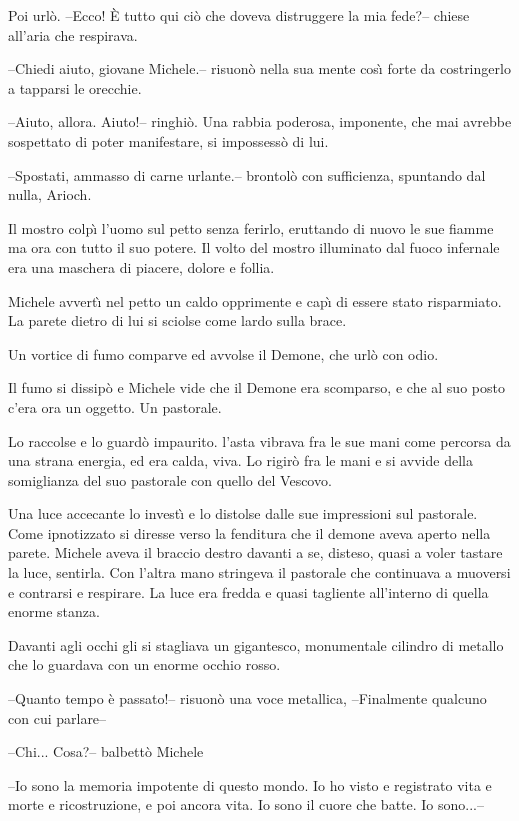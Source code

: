 \begin{racconto}
  Poi url\`o. --Ecco! \`E tutto qui ci\`o che doveva distruggere la
  mia fede?-- chiese all'aria che respirava.
  
  --Chiedi aiuto, giovane Michele.-- risuon\`o nella sua mente
  cos\`{\i} forte da costringerlo a tapparsi le orecchie.
  
  --Aiuto, allora. Aiuto!-- ringhi\`o. Una rabbia poderosa, imponente,
  che mai avrebbe sospettato di poter manifestare, si impossess\`o di
  lui.
  
  --Spostati, ammasso di carne urlante.-- brontol\`o con sufficienza,
  spuntando dal nulla, Arioch.
  
  Il mostro colp\`{\i} l'uomo sul petto senza ferirlo, eruttando di nuovo
  le sue fiamme ma ora con tutto il suo potere. Il volto del mostro
  illuminato dal fuoco infernale era una maschera di piacere, dolore e
  follia.
  
  Michele avvert\`{\i} nel petto un caldo opprimente e cap\`{\i} di
  essere stato risparmiato. La parete dietro di lui si sciolse come
  lardo sulla brace.
  
  Un vortice di fumo comparve ed avvolse il Demone, che url\`o con
  odio.
  
  Il fumo si dissip\`o e Michele vide che il Demone era scomparso, e
  che al suo posto c'era ora un oggetto. Un pastorale.
  
  Lo raccolse e lo guard\`o impaurito. l'asta vibrava fra le sue
  mani come percorsa da una strana energia, ed era calda, viva. Lo
  rigir\`o fra le mani e si avvide della somiglianza del suo
  pastorale con quello del Vescovo.
  
  Una luce accecante lo invest\`{\i} e lo distolse dalle sue
  impressioni sul pastorale. Come ipnotizzato si diresse verso la
  fenditura che il demone aveva aperto nella parete. Michele aveva il
  braccio destro davanti a se, disteso, quasi a voler tastare la luce,
  sentirla. Con l'altra mano stringeva il pastorale che continuava a
  muoversi e contrarsi e respirare. La luce era fredda e quasi
  tagliente all'interno di quella enorme stanza.
  
  Davanti agli occhi gli si stagliava un gigantesco, monumentale cilindro
  di metallo che lo guardava con un enorme occhio rosso.
  
  --Quanto tempo \`e passato!-- risuon\`o una voce metallica,
  --Finalmente qualcuno con cui parlare--
  
  --Chi... Cosa?-- balbett\`o Michele
  
  --Io sono la memoria impotente di questo mondo. Io ho visto e
  registrato vita e morte e ricostruzione, e poi ancora vita. Io sono
  il cuore che batte.  Io sono...--
  

\end{racconto}
